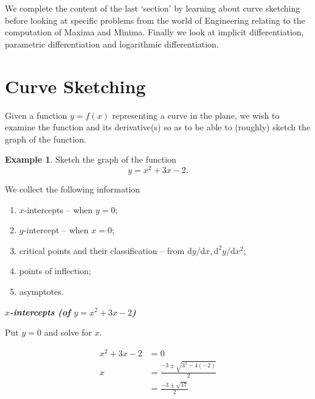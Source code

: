 \documentclass[
  11pt,
  oneside]{book}
\providecommand{\tightlist}{%
  \setlength{\itemsep}{0pt}\setlength{\parskip}{0pt}}
\newcommand{\slide}{}
\theoremstyle{definition}
\theoremstyle{definition}
\newtheorem{example}{Example}[chapter]
\theoremstyle{definition}
\theoremstyle{definition}
\theoremstyle{remark}
\begin{document}
We complete the content of the last `section' by learning about curve sketching before looking at specific problems from the world of Engineering relating to the computation of Maxima and Minima. Finally we look at implicit differentiation, parametric differentiation and logarithmic differentiation.

\slide

\section{Curve Sketching}\label{curve-sketching}

Given a function \(y=f(x)\) representing a curve in the plane, we wish to examine the function and its derivative(s) so as to be able to (roughly) sketch the graph of the function.

\begin{example}
Sketch the graph of the function
\[
y = x^2+3x-2.
\]
\end{example}

We collect the following information

\begin{enumerate}
\def\labelenumi{\arabic{enumi}.}
\tightlist
\item
  \(x\)-intercepts -- when \(y=0\);
\item
  \(y\)-intercept -- when \(x = 0\);
\item
  critical points and their classification -- from \(\mathrm{d}y/\mathrm{d} x, \mathrm{d}^2y/\mathrm{d}x^2\);
\item
  points of inflection;
\item
  asymptotes.
\end{enumerate}

\slide

\textbf{\emph{\(x\)-intercepts (of \(y = x^2+3x-2\))}}

Put \(y=0\) and solve for \(x\).

\begin{notslides}

\begin{align*}
x^2+3x-2 &= 0\\
x &= \frac{-3\pm\sqrt{3^2-4(-2)}}{2}\\
&=\frac{-3\pm\sqrt{17}}{2}
\end{align*}

\end{notslides}

\begin{slidesonly}

\vfill

\end{slidesonly}
\end{document}
